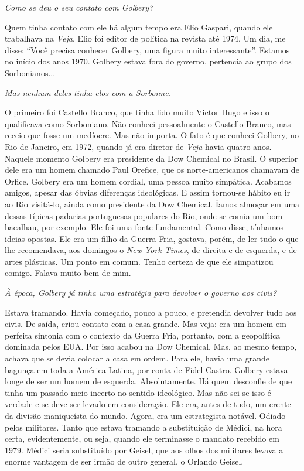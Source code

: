 \itshape
 Como se deu o seu contato com Golbery?

\normalfont 
Quem tinha contato com ele há algum tempo era Elio
Gaspari, quando ele trabalhava na \emph{Veja}. Elio foi editor de
política na revista até 1974. Um dia, me disse: ``Você precisa conhecer
Golbery, uma figura muito interessante''. Estamos no início dos anos
1970. Golbery estava fora do governo, pertencia ao grupo dos
Sorbonianos...

\itshape
 Mas nenhum deles tinha elos com a Sorbonne.

\normalfont 
O primeiro foi Castello Branco, que tinha lido muito
Victor Hugo e isso o qualificava como Sorboniano. Não conheci
pessoalmente o Castello Branco, mas receio que fosse um medíocre. Mas
não importa. O fato é que conheci Golbery, no Rio de Janeiro, em 1972,
quando já era diretor de \emph{Veja} havia quatro anos. Naquele momento
Golbery era presidente da Dow Chemical no Brasil. O superior dele era um
homem chamado Paul Orefice, que os norte-americanos chamavam de Orfice.
Golbery era um homem cordial, uma pessoa muito simpática. Acabamos
amigos, apesar das óbvias diferenças ideológicas. E assim tornou-se
hábito eu ir ao Rio visitá-lo, ainda como presidente da Dow Chemical.
Íamos almoçar em uma dessas típicas padarias portuguesas populares do
Rio, onde se comia um bom bacalhau, por exemplo. Ele foi uma fonte
fundamental. Como disse, tínhamos ideias opostas. Ele era um filho da
Guerra Fria, gostava, porém, de ler tudo o que lhe recomendava, aos
domingos o \emph{New York Times}, de direita e de esquerda, e de artes
plásticas. Um ponto em comum. Tenho certeza de que ele simpatizou
comigo. Falava muito bem de mim.

\itshape
 À época, Golbery já tinha uma estratégia para devolver
o governo aos civis?

\normalfont 
Estava tramando. Havia começado, pouco a pouco, e
pretendia devolver tudo aos civis. De saída, criou contato com a
casa-grande. Mas veja: era um homem em perfeita sintonia com o contexto
da Guerra Fria, portanto, com a geopolítica dominada pelos EUA. Por isso
acabou na Dow Chemical. Mas, ao mesmo tempo, achava que se devia colocar
a casa em ordem. Para ele, havia uma grande bagunça em toda a América
Latina, por conta de Fidel Castro. Golbery estava longe de ser um homem
de esquerda. Absolutamente. Há quem desconfie de que tinha um passado
meio incerto no sentido ideológico. Mas não sei se isso é verdade e se
deve ser levado em consideração. Ele era, antes de tudo, um crente da
divisão maniqueísta do mundo. Agora, era um estrategista notável. Odiado
pelos militares. Tanto que estava tramando a substituição de Médici, na
hora certa, evidentemente, ou seja, quando ele terminasse o mandato
recebido em 1979. Médici seria substituído por Geisel, que aos olhos dos
militares levava a enorme vantagem de ser irmão de outro general, o
Orlando Geisel.

